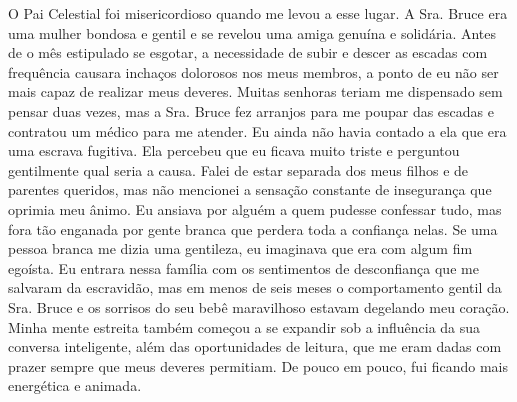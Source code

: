 O Pai Celestial foi misericordioso
quando me levou a esse lugar. A Sra. Bruce era uma mulher bondosa e
gentil e se revelou uma amiga genuína e solidária. Antes de o mês
estipulado se esgotar, a necessidade de subir e descer as escadas com
frequência causara inchaços dolorosos nos meus membros, a ponto de eu
não ser mais capaz de realizar meus deveres. Muitas senhoras teriam me
dispensado sem pensar duas vezes, mas a Sra. Bruce fez arranjos para me
poupar das escadas e contratou um médico para me atender. Eu ainda não
havia contado a ela que era uma escrava fugitiva. Ela percebeu que eu
ficava muito triste e perguntou gentilmente qual seria a causa. Falei de
estar separada dos meus filhos e de parentes queridos, mas não mencionei
a sensação constante de insegurança que oprimia meu ânimo. Eu ansiava
por alguém a quem pudesse confessar tudo, mas fora tão enganada por
gente branca que perdera toda a confiança nelas. Se uma pessoa branca me
dizia uma gentileza, eu imaginava que era com algum fim egoísta. Eu
entrara nessa família com os sentimentos de desconfiança que me salvaram
da escravidão, mas em menos de seis meses o comportamento gentil da Sra.
Bruce e os sorrisos do seu bebê maravilhoso estavam degelando meu
coração. Minha mente estreita também começou a se expandir sob a
influência da sua conversa inteligente, além das oportunidades de
leitura, que me eram dadas com prazer sempre que meus deveres permitiam.
De pouco em pouco, fui ficando mais energética e animada.

